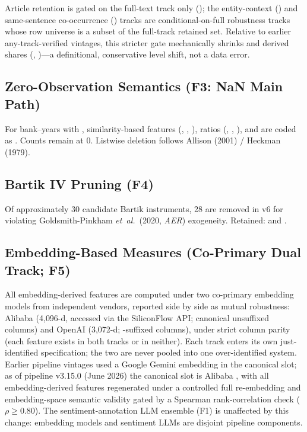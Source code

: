 Article retention is gated on the full-text track only
(); the entity-context () and
same-sentence co-occurrence () tracks are conditional-on-full
robustness tracks whose row universe is a subset of the full-track
retained set. Relative to earlier any-track-verified vintages, this
stricter gate mechanically shrinks  and derived
shares (, )---a
definitional, conservative level shift, not a data error.

\subsection{Zero-Observation Semantics (F3: NaN Main Path)}
For bank--years with , similarity-based features
(, , ),
ratios (, ,
), and  are coded
as . Counts remain at 0. Listwise deletion follows Allison
(2001) / Heckman (1979).

\subsection{Bartik IV Pruning (F4)}
Of approximately 30 candidate Bartik instruments, 28 are removed in v6
for violating Goldsmith-Pinkham \emph{et~al.}\ (2020, \emph{AER})
exogeneity. Retained:  and
.

\subsection{Embedding-Based Measures (Co-Primary Dual Track; F5)}
All embedding-derived features are computed under two co-primary
embedding models from independent vendors, reported side by side as
mutual robustness: Alibaba  (4{,}096-d,
accessed via the SiliconFlow API; canonical unsuffixed columns) and
OpenAI  (3{,}072-d; -suffixed
columns), under strict column parity (each feature exists in both
tracks or in neither). Each track enters its own just-identified
specification; the two are never pooled into one over-identified
system. Earlier pipeline vintages used a Google Gemini embedding in
the canonical slot; as of pipeline v3.15.0 (June 2026) the canonical
slot is Alibaba , with all embedding-derived
features regenerated under a controlled full re-embedding and
embedding-space semantic validity gated by a Spearman
rank-correlation check ($\rho \geq 0.80$). The sentiment-annotation
LLM ensemble (F1) is unaffected by this change: embedding models and
sentiment LLMs are disjoint pipeline components.

